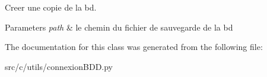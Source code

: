 Creer une copie de la bd. 


\begin{DoxyParams}{Parameters}
{\em path} & le chemin du fichier de sauvegarde de la bd \\
\hline
\end{DoxyParams}


The documentation for this class was generated from the following file\+:\begin{DoxyCompactItemize}
\item 
src/c/utils/connexion\+B\+D\+D.\+py\end{DoxyCompactItemize}
